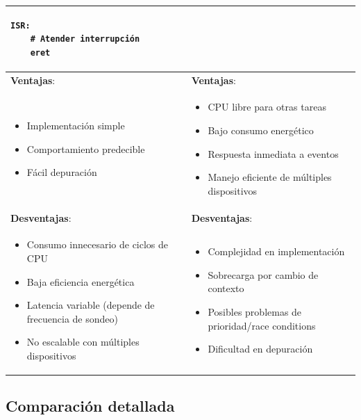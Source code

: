 \documentclass[12pt]{article}
\begin{document}
\begin{table}[h]
\begin{tabularx}{\textwidth}{|>{\raggedright\arraybackslash}X|>{\raggedright\arraybackslash}X|}
\begin{minipage}[t]{0.45\textwidth}
\begin{itemize}[leftmargin=*,noitemsep]
\begin{lstlisting}
ISR:
    # Atender interrupción
    eret
    \end{lstlisting}
\end{itemize}
\end{minipage} \\
\hline
\textbf{Ventajas}: & \textbf{Ventajas}: \\
\begin{itemize}[leftmargin=*,noitemsep]
    \item Implementación simple
    \item Comportamiento predecible
    \item Fácil depuración
\end{itemize} &
\begin{itemize}[leftmargin=*,noitemsep]
    \item CPU libre para otras tareas
    \item Bajo consumo energético
    \item Respuesta inmediata a eventos
    \item Manejo eficiente de múltiples dispositivos
\end{itemize} \\
\hline
\textbf{Desventajas}: & \textbf{Desventajas}: \\
\begin{itemize}[leftmargin=*,noitemsep]
    \item Consumo innecesario de ciclos de CPU
    \item Baja eficiencia energética
    \item Latencia variable (depende de frecuencia de sondeo)
    \item No escalable con múltiples dispositivos
\end{itemize} &
\begin{itemize}[leftmargin=*,noitemsep]
    \item Complejidad en implementación
    \item Sobrecarga por cambio de contexto
    \item Posibles problemas de prioridad/race conditions
    \item Dificultad en depuración
\end{itemize} \\
\hline
\end{tabularx}
\end{table}

\subsection*{Comparación detallada}
\end{document}
